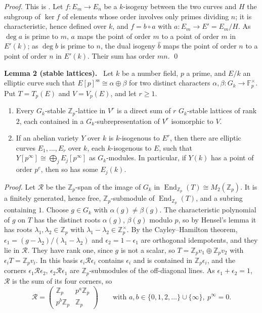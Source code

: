 \documentclass[11pt]{article}
\newenvironment{statement}[1]{\par\medskip\noindent\phantomsection\textbf{#1}\ }{\par\medskip}
\newcommand{\Z}{\mathbb Z}
\newcommand{\F}{\mathbb F}
\DeclareMathOperator{\End}{End}
\begin{document}
\emph{Proof.} This is \cite[Lemma~1]{P63}. Let \(f:E_m\to E_n\) be a \(k\)-isogeny between the two
curves and \(H\) the subgroup of \(\ker f\) of elements whose order involves only primes dividing
\(n\); it is characteristic, hence defined over \(k\), and \(f=b\circ a\) with
\(a:E_m\to E'=E_m/H\). As \(\deg a\) is prime to \(m\), \(a\) maps the point of order \(m\) to a point
of order \(m\) in \(E'(k)\); as \(\deg b\) is prime to \(n\), the dual isogeny \(\hat b\) maps the
point of order \(n\) to a point of order \(n\) in \(E'(k)\). Their sum has order \(mn\). \qed

\begin{statement}{Lemma 2 (stable lattices).}\label{lemma-lattice}
Let \(k\) be a number field, \(p\) a prime, and \(E/k\) an elliptic curve such that
\(E[p]^{\mathrm{ss}}\cong\alpha\oplus\beta\) for two distinct characters
\(\alpha,\beta:G_k\to\F_p^\times\). Put \(T=T_p(E)\) and \(V=V_p(E)\), and let \(r\ge1\).
\begin{enumerate}
\item[(a)] Every \(G_k\)-stable \(\Z_p\)-lattice in \(V^r\) is a direct sum of \(r\) \(G_k\)-stable
lattices of rank \(2\), each contained in a \(G_k\)-subrepresentation of \(V^r\) isomorphic to \(V\).
\item[(b)] If an abelian variety \(Y\) over \(k\) is \(k\)-isogenous to \(E^r\), then there are
elliptic curves \(E_1,\dots,E_r\) over \(k\), each \(k\)-isogenous to \(E\), such that
\(Y[p^\infty]\cong\bigoplus_jE_j[p^\infty]\) as \(G_k\)-modules. In particular,
if \(Y(k)\) has a point of order \(p^e\), then so has some \(E_j(k)\).
\end{enumerate}
\end{statement}

\emph{Proof.} Let \(\mathcal R\) be the \(\Z_p\)-span of the image of \(G_k\) in
\(\End_{\Z_p}(T)\cong M_2(\Z_p)\). It is a finitely generated, hence free, \(\Z_p\)-submodule of
\(\End_{\Z_p}(T)\), and a subring containing \(1\). Choose \(g\in G_k\) with
\(\alpha(g)\neq\beta(g)\). The characteristic polynomial of \(g\) on \(T\) has the distinct roots
\(\alpha(g)\), \(\beta(g)\) modulo \(p\), so by Hensel's lemma it has roots \(\lambda_1,\lambda_2\in\Z_p\)
with \(\lambda_1-\lambda_2\in\Z_p^\times\). By the Cayley--Hamilton theorem,
\(\epsilon_1=(g-\lambda_2)/(\lambda_1-\lambda_2)\) and \(\epsilon_2=1-\epsilon_1\) are orthogonal
idempotents, and they lie in \(\mathcal R\). They have rank one, since \(g\) is not a scalar, so
\(T=\Z_pv_1\oplus\Z_pv_2\) with \(\epsilon_iT=\Z_pv_i\). In this basis \(\epsilon_i\mathcal R\epsilon_i\)
contains \(\epsilon_i\) and is contained in \(\Z_p\epsilon_i\), and the corners
\(\epsilon_1\mathcal R\epsilon_2\), \(\epsilon_2\mathcal R\epsilon_1\) are \(\Z_p\)-submodules of the
off-diagonal lines. As \(\epsilon_1+\epsilon_2=1\), \(\mathcal R\) is the sum of its four corners, so
\[\mathcal R=\begin{pmatrix}\Z_p&p^a\Z_p\\ p^b\Z_p&\Z_p\end{pmatrix}\qquad\text{with }
a,b\in\{0,1,2,\dots\}\cup\{\infty\},\ p^\infty=0.\]
\end{document}
